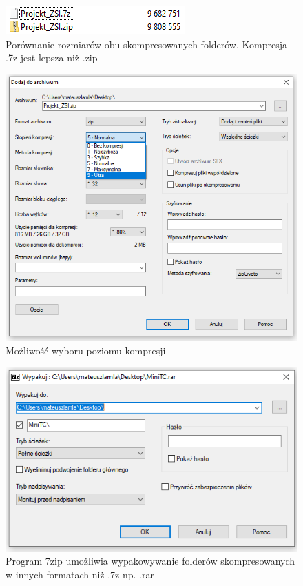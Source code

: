 \documentclass[0.82pt,a4paper]{article}
\begin{document}
    \begin{figure}[H]
        \centering
        \includegraphics[width=0.8\linewidth]{media/7zip/3_porownanie_rozmiarow.PNG}
        \caption[]{Porównanie rozmiarów obu skompresowanych folderów. Kompresja .7z jest lepsza niż .zip}
        \label{fig:7z_porownanie_rozmiarow}
    \end{figure}

    \begin{figure}[H]
        \centering
        \includegraphics[width=0.8\linewidth]{media/7zip/4_poziom_kompresji.PNG}
        \caption[]{Możliwość wyboru poziomu kompresji}
        \label{fig:7z_poziom_kompresji}
    \end{figure}

    \begin{figure}[H]
        \centering
        \includegraphics[width=0.8\linewidth]{media/7zip/5_wypakowywanie_innych_formatow_np_rar.PNG}
        \caption[]{Program 7zip umożliwia wypakowywanie folderów skompresowanych w innych formatach niż .7z np. .rar}
        \label{fig:7z_wypakowanie_rar}
    \end{figure}
\end{document}
